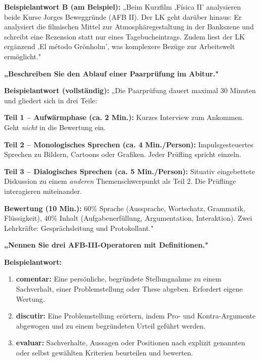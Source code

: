 \documentclass[11pt,a4paper]{article}
\begin{document}
\textbf{Beispielantwort B (am Beispiel):}
„Beim Kurzfilm ‚Física II' analysieren beide Kurse Jorges Beweggründe (AFB II). Der LK geht darüber hinaus: Er analysiert die filmischen Mittel zur Atmosphäregestaltung in der Bankszene und schreibt eine Rezension statt nur eines Tagebucheintrags. Zudem liest der LK ergänzend ‚El método Grönholm', was komplexere Bezüge zur Arbeitswelt ermöglicht."

\vspace{0.4cm}

\begin{exambox}
\textbf{„Beschreiben Sie den Ablauf einer Paarprüfung im Abitur."}
\end{exambox}

\textbf{Beispielantwort (vollständig):}
„Die Paarprüfung dauert maximal 30 Minuten und gliedert sich in drei Teile:

\textbf{Teil 1 -- Aufwärmphase (ca. 2 Min.):} Kurzes Interview zum Ankommen. Geht \textit{nicht} in die Bewertung ein.

\textbf{Teil 2 -- Monologisches Sprechen (ca. 4 Min./Person):} Impulsgesteuertes Sprechen zu Bildern, Cartoons oder Grafiken. Jeder Prüfling spricht einzeln.

\textbf{Teil 3 -- Dialogisches Sprechen (ca. 5 Min./Person):} Situativ eingebettete Diskussion zu einem \textit{anderen} Themenschwerpunkt als Teil 2. Die Prüflinge interagieren miteinander.

\textbf{Bewertung (10 Min.):} 60\% Sprache (Aussprache, Wortschatz, Grammatik, Flüssigkeit), 40\% Inhalt (Aufgabenerfüllung, Argumentation, Interaktion). Zwei Lehrkräfte: Gesprächsleitung und Protokollant."

\vspace{0.4cm}

\begin{exambox}
\textbf{„Nennen Sie drei AFB-III-Operatoren mit Definitionen."}
\end{exambox}

\textbf{Beispielantwort:}
\begin{enumerate}[leftmargin=0.5cm, itemsep=2pt]
\item \textbf{comentar:} Eine persönliche, begründete Stellungnahme zu einem Sachverhalt, einer Problemstellung oder These abgeben. Erfordert eigene Wertung.
\item \textbf{discutir:} Eine Problemstellung erörtern, indem Pro- und Kontra-Argumente abgewogen und zu einem begründeten Urteil geführt werden.
\item \textbf{evaluar:} Sachverhalte, Aussagen oder Positionen nach explizit genannten oder selbst gewählten Kriterien beurteilen und bewerten.
\end{enumerate}
\end{document}

